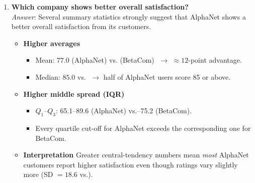 \documentclass[12pt]{article}
\begin{document}
\begin{enumerate}[label=2.\arabic*]
\item \textbf{Which company shows better overall satisfaction?}\\[2pt]
\emph{Answer}:  Several summary statistics strongly suggest that AlphaNet shows a better overall satisfaction from its customers. 
\begin{itemize}
    \item \textbf{Higher averages}
        \begin{itemize}
            \item Mean: \(\mathbf{77.0}\) (AlphaNet) vs. (BetaCom) \(\;\to\) \(\approx\!\!12\)-point advantage.
            \item Median: \(\mathbf{85.0}\) vs. \(\;\to\) half of AlphaNet users score 85 or above.
        \end{itemize}
    \item \textbf{Higher middle spread (IQR)}
        \begin{itemize}
            \item \(Q_1\)–\(Q_3\): 65.1–89.6 (AlphaNet) vs.–75.2 (BetaCom).  
            \item Every quartile cut-off for AlphaNet exceeds the corresponding one for BetaCom.
        \end{itemize}
    \item \textbf{Interpretation}  
        Greater central-tendency numbers mean \emph{most} AlphaNet customers report higher satisfaction even though ratings vary slightly more (SD \(=18.6\) vs.).
\end{itemize}


\end{enumerate}
\end{document}
